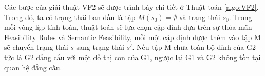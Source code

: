 \documentclass[12pt]{report}
\newenvironment{thuattoan}[1][h]
  {\renewcommand{\algorithmcfname}{Thuật toán}
   \begin{algorithm}[#1]
  }{\end{algorithm}}
\begin{document}
\newpage
\noindent Các bược của giải thuật VF2 \cite{vf2_1368} sẽ được trình bày chi tiết ở Thuật toán \ref{algo:VF2}. Trong đó, ta có trạng thái ban đầu là tập $M(s_0) = \emptyset $ và trạng thái $s_0$. Trong mỗi vòng lặp tính toán, thuật toán sẽ lựa chọn cặp đỉnh dựa trên sự thỏa mãn  Feasibility Rules và Semantic Feasibility, mỗi một cặp định được thêm vào tập M sẽ chuyển trạng thái $s$ sang trạng thái $s'$. Nếu tập M chưa toàn bộ đỉnh của G2 tức là G2 đẳng cấu với một đồ thị con của G1, ngược lại G1 và G2 không tồn tại quan hệ đẳng cấu.
%	
%	
%	
\end{document}
